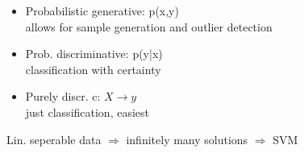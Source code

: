 \begin{itemize}
    \item Probabilistic generative: p(x,y)\\
    allows for sample generation and outlier detection
    \item Prob. discriminative: p(y|x) \\
    classification with certainty
    \item Purely discr. c: $X \rightarrow y$ \\
    just classification, easiest
\end{itemize}

Lin. seperable data $\Rightarrow$ infinitely many solutions $\Rightarrow$ SVM





